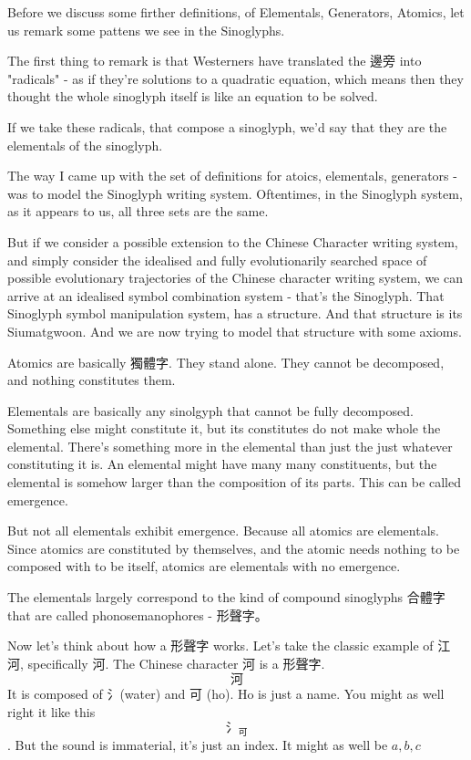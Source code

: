 Before we discuss some firther definitions, of Elementals, Generators, Atomics, let us remark some pattens we see in the Sinoglyphs. 

The first thing to remark is that Westerners have translated the 邊旁 into "radicals" - as if they're solutions to a quadratic equation, which means then they thought the whole sinoglyph itself is like an equation to be solved. 

If we take these radicals, that compose a sinoglyph, we'd say that they are the elementals of the sinoglyph. 

The way I came up with the set of definitions for atoics, elementals, generators - was to model the Sinoglyph writing system. Oftentimes, in the Sinoglyph system, as it appears to us, all three sets are the same. 

But if we consider a possible extension to the Chinese Character writing system, and simply consider the idealised and fully evolutionarily searched space of possible evolutionary trajectories of the Chinese character writing system, we can arrive at an idealised symbol combination system - that's the Sinoglyph. That Sinoglyph symbol manipulation system, has a structure. And that structure is its Siumatgwoon. And we are now trying to model that structure with some axioms. 

Atomics are basically 獨體字. They stand alone. They cannot be decomposed, and nothing constitutes them. 

Elementals are basically any sinolgyph that cannot be fully decomposed. Something else might constitute it, but its constitutes do not make whole the elemental. There's something more in the elemental than just the just whatever constituting it is. An elemental might have many many constituents, but the elemental is somehow larger than the composition of its parts. This can be called emergence. 

But not all elementals exhibit emergence. Because all atomics are elementals. Since atomics are constituted by themselves, and the atomic needs nothing to be composed with to be itself, atomics are elementals with no emergence. 

The elementals largely correspond to the kind of compound sinoglyphs 合體字 that are called phonosemanophores - 形聲字。 

Now let's think about how a 形聲字 works. Let's take the classic example of 江河, specifically 河. The Chinese character 河 is a 形聲字. 
$$\text{河}$$
It is composed of 氵(water) and 可 (ho). Ho is just a name. You might as well right it like this $$\text{氵}_{\text{可}}$$. But the sound is immaterial, it's just an index. It might as well be $a,b,c$


